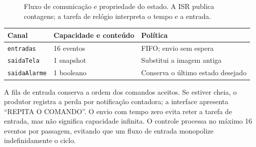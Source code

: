 \begin{figure}[htbp]
\centering
{}
\caption{Fluxo de comunicação e propriedade do estado. A ISR publica contagens; a tarefa de relógio interpreta o tempo e a entrada.}
\end{figure}

\begin{center}\small
\begin{tabularx}{\textwidth}{@{}YYY@{}}\toprule

\textbf{Canal} & \textbf{Capacidade e conteúdo} & \textbf{Política} \\ \midrule

\texttt{entradas} & 16 eventos & FIFO; envio sem espera \\

\texttt{saidaTela} & 1 snapshot & Substitui a imagem antiga \\

\texttt{saidaAlarme} & 1 booleano & Conserva o último estado desejado \\

\bottomrule\end{tabularx}
\end{center}

A fila de entrada conserva a ordem dos comandos aceitos. Se estiver cheia, o produtor registra a perda por notificação contadora; a interface apresenta “REPITA O COMANDO”. O envio com tempo zero evita reter a tarefa de entrada, mas não significa capacidade infinita. O controle processa no máximo 16 eventos por passagem, evitando que um fluxo de entrada monopolize indefinidamente o ciclo.

